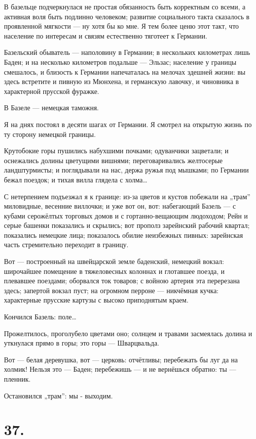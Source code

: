 \documentclass[12pt,a4paper,oneside]{book}
\begin{document}
В базельце подчеркнулася не простая обязанность быть корректным со всеми, а активная воля быть подлинно человеком; развитие социального такта сказалось в проявленной мягкости — ну хотя бы ко мне. Я тем более ценю этот такт, что население по интересам и связям естественно тяготеет к Германии.

Базельский обыватель — наполовину в Германии; в нескольких километрах лишь Баден; и на несколько километров подальше — Эльзас; население у границы смешалось, и близость к Германии напечаталась на мелочах здешней жизни: вы здесь встретите и пивную из Мюнхена, и германскую лавочку, и чиновника в характерной прусской фуражке.

В Базеле — немецкая таможня.

Я на днях постоял в десяти шагах от Германии. Я смотрел на открытую жизнь по ту сторону немецкой границы.

Крутобокие горы пушились набухшими почками; одуванчики зацветали; и оснежались долины цветущими вишнями; переговаривались желтосерые ландштурмисты; и поглядывали на нас, держа ружья под мышками; по Германии бежал поездок; и тихая вилла глядела с холма…

С нетерпением подъезжал я к границе: из-за цветов и кустов побежали на „трам” миловидные, весенние виллочки; и уже вот он, вот: набегающий Базель — с кубами серожёлтых торговых домов и с гортанно-вещающим людоходом; Рейн и серые башенки показались и скрылись; вот прополз зарейнский рабочий квартал; показались немецкие лица; показалось обилие неизбежных пивных: зарейнская часть стремительно переходит в границу.

Вот — построенный на швейцарской земле баденский, немецкий вокзал: широчайшее помещение в тяжеловесных колоннах и глотавшее поезда, и плевавшее поездами; оборвался ток товаров; с войною артерия эта перерезана здесь; запертой вокзал пуст; на огромном перроне — никчёмная кучка: характерные прусские картузы с высоко приподнятым краем.

Кончился Базель: поле…

Прожелтилось, проголубело цветами оно; солнцем и травами засмеялась долина и уткнулася прямо в горы; это горы — Шварцвальда.

Вот — белая деревушка, вот — церковь: отчётливы; перебежать бы луг да на холмик! Нельзя это — Баден; перебежишь — и не вернёшься обратно: ты — пленник.

Остановился „трам”: мы - выходим.

\section*{37.}
\end{document}
